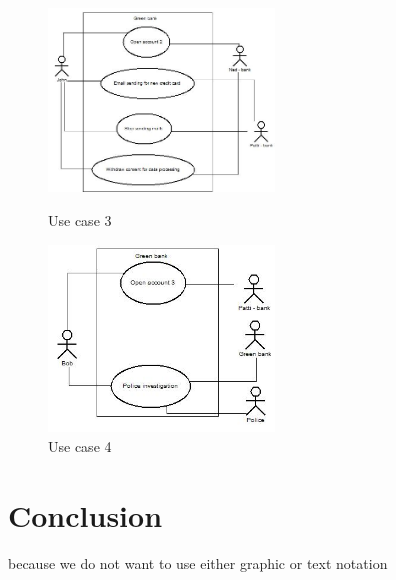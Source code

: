 \documentclass[11pt,english]{article}
\begin{document}
\begin{figure}[H]
\centering
\begin{minipage}{.5\textwidth}
  \centering
  \includegraphics[width=6cm,scale=0.5]{images/use case3.jpg}
  \caption{Use case 3}
  \label{fig:usecase3}
\end{minipage}%
\begin{minipage}{.5\textwidth}
  \centering
  \includegraphics[width=6cm,scale=0.5]{images/use case4.jpg}
  \caption{Use case 4}
  \label{fig:usecase4}
\end{minipage}
\end{figure}
\section{Conclusion}
because we do not want to use either graphic or text notation
\printbibliography
\end{document}

